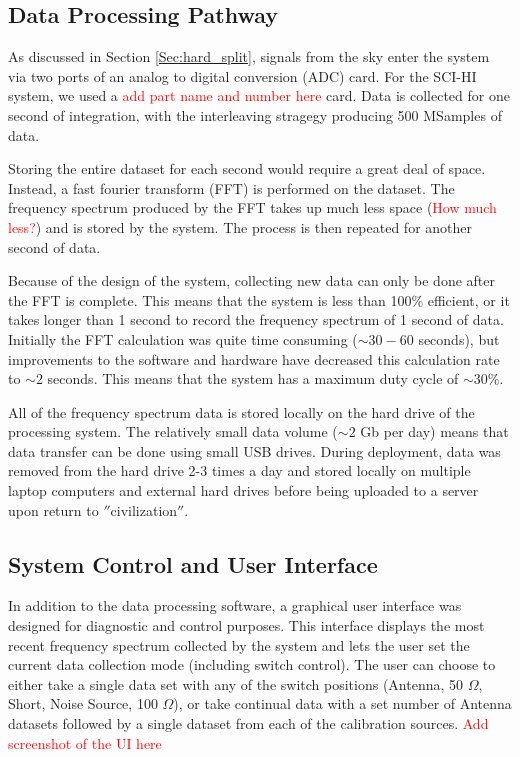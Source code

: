 \subsection{Data Processing Pathway}
As discussed in Section \ref{Sec:hard_split}, signals from the sky enter the system via two ports of an analog to digital conversion (ADC) card. For the SCI-HI system, we used a \textcolor{red}{add part name and number here} card. Data is collected for one second of integration, with the interleaving stragegy producing 500 MSamples of data. 

Storing the entire dataset for each second would require a great deal of space. Instead, a fast fourier transform (FFT) is performed on the dataset. The frequency spectrum produced by the FFT takes up much less space (\textcolor{red}{How much less?}) and is stored by the system. The process is then repeated for another second of data. 

Because of the design of the system, collecting new data can only be done after the FFT is complete. This means that the system is less than 100\% efficient, or it takes longer than 1 second to record the frequency spectrum of 1 second of data. Initially the FFT calculation was quite time consuming ($\sim 30-60$ seconds), but improvements to the software and hardware have decreased this calculation rate to $\sim 2$ seconds. This means that the system has a maximum duty cycle of $\sim30$\%. 

All of the frequency spectrum data is stored locally on the hard drive of the processing system. The relatively small data volume ($\sim 2$ Gb per day) means that data transfer can be done using small USB drives. During deployment, data was removed from the hard drive 2-3 times a day and stored locally on multiple laptop computers and external hard drives before being uploaded to a server upon return to $''$civilization$''$. 

\subsection{System Control and User Interface}
In addition to the data processing software, a graphical user interface was designed for diagnostic and control purposes. This interface displays the most recent frequency spectrum collected by the system and lets the user set the current data collection mode (including switch control). The user can choose to either take a single data set with any of the switch positions (Antenna, 50 $\Omega$, Short, Noise Source, 100 $\Omega$), or take continual data with a set number of Antenna datasets followed by a single dataset from each of the calibration sources. \textcolor{red}{Add screenshot of the UI here}

